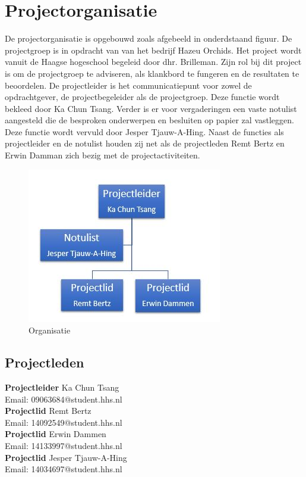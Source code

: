 
\section{Projectorganisatie}

De projectorganisatie is opgebouwd zoals afgebeeld in onderdstaand figuur. De projectgroep is in opdracht van van het bedrijf Hazeu Orchids.
Het project wordt vanuit de Haagse hogeschool begeleid door dhr. Brilleman. Zijn rol bij
dit project is om de projectgroep te adviseren, als klankbord te fungeren en de resultaten
te beoordelen. De projectleider is het communicatiepunt voor zowel de opdrachtgever, de
projectbegeleider als de projectgroep. Deze functie wordt bekleed door Ka Chun Tsang.
Verder is er voor vergaderingen een vaste notulist aangesteld die de besproken onderwerpen
en besluiten op papier zal vastleggen. Deze functie wordt vervuld door Jesper Tjauw-A-Hing.
Naast de functies als projectleider en de notulist houden zij net als de projectleden Remt Bertz en Erwin Damman zich bezig met de projectactiviteiten.

\begin{figure}[h]
	\centering
	\includegraphics[width=\textwidth]{Afbeeldingen/Organisatie.JPG}
	\caption{Organisatie} 
\end{figure}
\newpage

\subsection{Projectleden}

\textbf{Projectleider}
Ka Chun Tsang\\
Email: 09063684@student.hhs.nl\\[0.5cm]

\textbf{Projectlid}
Remt Bertz\\
Email: 14092549@student.hhs.nl\\[0.5cm]

\textbf{Projectlid}
Erwin Dammen\\
Email: 14133997@student.hhs.nl\\[0.5cm]

\textbf{Projectlid}
Jesper Tjauw-A-Hing\\
Email: 14034697@student.hhs.nl\\[0.5cm]

\newpage

